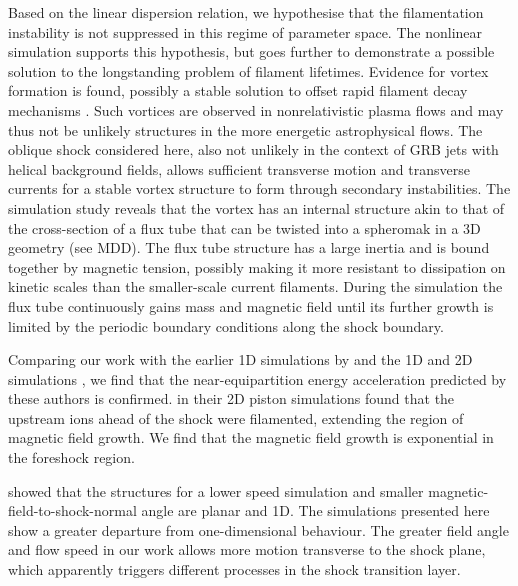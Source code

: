 \documentclass[structabstract]{aa}
\begin{document}
Based on the linear dispersion relation, we hypothesise that the filamentation instability is not suppressed in this 
regime of parameter space. The nonlinear simulation supports this hypothesis, but goes further to demonstrate a 
possible solution to the longstanding problem of filament lifetimes. Evidence for vortex formation is found, possibly 
a stable solution to offset rapid filament decay mechanisms \citep{Waxman:2006qy}. Such vortices are observed in nonrelativistic plasma flows \citep{Alexandrova:2006lr} and may thus not be unlikely structures in the more
energetic astrophysical flows. The oblique shock considered here, also not unlikely in the context of GRB jets with 
helical background fields, allows sufficient transverse motion and transverse currents for a stable vortex structure 
to form through secondary instabilities. The simulation study reveals that the vortex has an internal structure akin 
to that of the cross-section of a flux tube that can be twisted into a spheromak in a 3D geometry (see MDD).
The flux tube structure has a large inertia and is bound together by magnetic tension, possibly making it more resistant 
to dissipation on kinetic scales than the smaller-scale current filaments. During the simulation the flux tube 
continuously gains mass and magnetic field until its further growth is limited by the periodic boundary conditions 
along the shock boundary.


Comparing our work with the earlier 1D simulations by \citet{Bessho:1999sf} and the 1D and 2D simulations  \citep{Dieckmann:2008dp,Dieckmann:2010qf}, we find that the near-equipartition energy acceleration predicted 
by these authors is confirmed. \citet{Martins:2009ly} in their 2D piston simulations found that the upstream 
ions ahead of the shock were filamented, extending the region of magnetic field growth. We find that the magnetic 
field growth is exponential in the foreshock region.

\citet{Dieckmann:2010qf} showed that the structures for a lower speed simulation and smaller 
magnetic-field-to-shock-normal angle are planar and 1D. The simulations presented here show a greater departure 
from one-dimensional behaviour. The greater field angle and flow speed in our work allows more motion transverse 
to the shock plane, which apparently triggers different processes in the shock transition layer.
\end{document}
